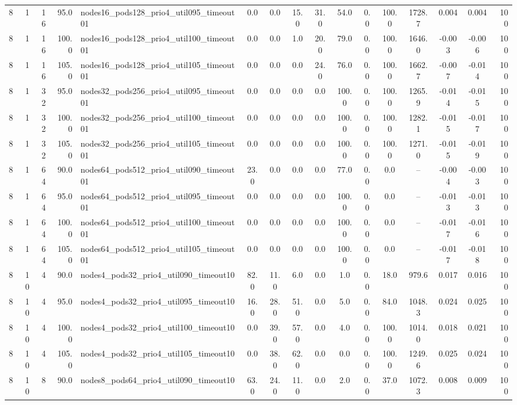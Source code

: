 \begin{tabular}{r r r r l c c c c c c c c c c r}
8 & 1 & 16 & 95.0 & nodes16\_pods128\_prio4\_util095\_timeout01 & 0.0 & 0.0 & 15.0 & 31.0 & 54.0 & 0.0 & 100.0 & 1728.7 & 0.004 & 0.004 & 100 \\
8 & 1 & 16 & 100.0 & nodes16\_pods128\_prio4\_util100\_timeout01 & 0.0 & 0.0 & 1.0 & 20.0 & 79.0 & 0.0 & 100.0 & 1646.0 & -0.003 & -0.006 & 100 \\
8 & 1 & 16 & 105.0 & nodes16\_pods128\_prio4\_util105\_timeout01 & 0.0 & 0.0 & 0.0 & 24.0 & 76.0 & 0.0 & 100.0 & 1662.7 & -0.007 & -0.014 & 100 \\
8 & 1 & 32 & 95.0 & nodes32\_pods256\_prio4\_util095\_timeout01 & 0.0 & 0.0 & 0.0 & 0.0 & 100.0 & 0.0 & 100.0 & 1265.9 & -0.014 & -0.015 & 100 \\
8 & 1 & 32 & 100.0 & nodes32\_pods256\_prio4\_util100\_timeout01 & 0.0 & 0.0 & 0.0 & 0.0 & 100.0 & 0.0 & 100.0 & 1282.1 & -0.015 & -0.017 & 100 \\
8 & 1 & 32 & 105.0 & nodes32\_pods256\_prio4\_util105\_timeout01 & 0.0 & 0.0 & 0.0 & 0.0 & 100.0 & 0.0 & 100.0 & 1271.0 & -0.015 & -0.019 & 100 \\
8 & 1 & 64 & 90.0 & nodes64\_pods512\_prio4\_util090\_timeout01 & 23.0 & 0.0 & 0.0 & 0.0 & 77.0 & 0.0 & 0.0 & -- & -0.004 & -0.003 & 100 \\
8 & 1 & 64 & 95.0 & nodes64\_pods512\_prio4\_util095\_timeout01 & 0.0 & 0.0 & 0.0 & 0.0 & 100.0 & 0.0 & 0.0 & -- & -0.013 & -0.013 & 100 \\
8 & 1 & 64 & 100.0 & nodes64\_pods512\_prio4\_util100\_timeout01 & 0.0 & 0.0 & 0.0 & 0.0 & 100.0 & 0.0 & 0.0 & -- & -0.017 & -0.016 & 100 \\
8 & 1 & 64 & 105.0 & nodes64\_pods512\_prio4\_util105\_timeout01 & 0.0 & 0.0 & 0.0 & 0.0 & 100.0 & 0.0 & 0.0 & -- & -0.017 & -0.018 & 100 \\
8 & 10 & 4 & 90.0 & nodes4\_pods32\_prio4\_util090\_timeout10 & 82.0 & 11.0 & 6.0 & 0.0 & 1.0 & 0.0 & 18.0 & 979.6 & 0.017 & 0.016 & 100 \\
8 & 10 & 4 & 95.0 & nodes4\_pods32\_prio4\_util095\_timeout10 & 16.0 & 28.0 & 51.0 & 0.0 & 5.0 & 0.0 & 84.0 & 1048.3 & 0.024 & 0.025 & 100 \\
8 & 10 & 4 & 100.0 & nodes4\_pods32\_prio4\_util100\_timeout10 & 0.0 & 39.0 & 57.0 & 0.0 & 4.0 & 0.0 & 100.0 & 1014.0 & 0.018 & 0.021 & 100 \\
8 & 10 & 4 & 105.0 & nodes4\_pods32\_prio4\_util105\_timeout10 & 0.0 & 38.0 & 62.0 & 0.0 & 0.0 & 0.0 & 100.0 & 1249.6 & 0.025 & 0.024 & 100 \\
8 & 10 & 8 & 90.0 & nodes8\_pods64\_prio4\_util090\_timeout10 & 63.0 & 24.0 & 11.0 & 0.0 & 2.0 & 0.0 & 37.0 & 1072.3 & 0.008 & 0.009 & 100 \\

\end{tabular}
